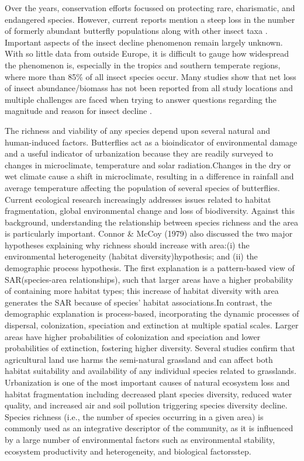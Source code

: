 \documentclass[prl,showpacs,superscriptaddress,twocolumn,longbibliography]{revtex4-1}
\begin{document}
Over the years, conservation efforts focussed on protecting rare, charismatic, and endangered species. However, current reports mention a steep loss in the number of formerly abundant butterfly populations along with other insect taxa \cite{Wagner2021}. Important aspects of the insect decline phenomenon remain largely unknown. With so little data from outside Europe, it is difficult to gauge how widespread the phenomenon is, especially in the tropics and southern temperate regions, where more than 85\% of all insect species occur. Many studies show that net loss of insect abundance/biomass has not been reported from all study locations and multiple challenges are faced when trying to answer questions regarding the magnitude and reason for insect decline \cite{Montgomery2020}.


The richness and viability of any species depend upon several natural and human-induced factors. Butterflies act as a bioindicator of environmental damage and a useful indicator of urbanization because they are readily surveyed to changes in microclimate, temperature and solar radiation\cite{Clark2007}.Changes in the dry or wet climate cause a shift in microclimate, resulting in a difference in rainfall and average temperature affecting the population of several species of butterflies\cite{Haneda2019}. Current ecological research increasingly addresses issues related to habitat fragmentation, global environmental change and loss of biodiversity. Against this background, understanding the relationship between species richness and the area is particularly important. Connor \& McCoy (1979) also discussed the two major hypotheses explaining why richness should increase with area:(i) the environmental heterogeneity (habitat diversity)hypothesis; and (ii) the demographic process hypothesis. The first explanation is a pattern-based view of SAR(species-area relationships), such that larger areas have a higher probability of containing more habitat types; this increase of habitat diversity with area generates the SAR because of species' habitat associations.In contrast, the demographic explanation is process-based, incorporating the dynamic processes of dispersal, colonization, speciation and extinction at multiple spatial scales. Larger areas have higher probabilities of colonization and speciation and lower probabilities of extinction, fostering higher diversity\cite{Drakare2006}. Several studies confirm that agricultural land use harms the semi-natural grassland and can affect both habitat suitability and availability of any individual species related to grasslands\cite{smith}. Urbanization is one of the most important causes of natural ecosystem loss and habitat fragmentation including decreased plant species diversity, reduced water quality, and increased air and soil pollution triggering species diversity decline\cite{smith,Tzortzakaki2019}. Species richness (i.e., the number of species occurring in a given area) is commonly used as an integrative descriptor of the community, as it is influenced by a large number of environmental factors such as environmental stability, ecosystem productivity and heterogeneity, and biological factorsstep\cite{Park2003}.
\end{document}
